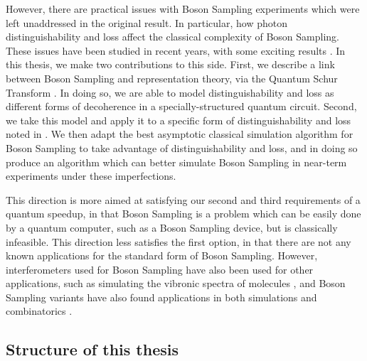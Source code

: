 However, there are practical issues with Boson Sampling experiments which were left unaddressed in the original result. In particular, how photon distinguishability and loss affect the classical complexity of Boson Sampling. These issues have been studied in recent years, with some exciting results \cite{garciapatron2017, renema2018, renema2018loss, oszmaniec2018, brod2019}. In this thesis, we make two contributions to this side. First, we describe a link between Boson Sampling and representation theory, via the Quantum Schur Transform \cite{bacon2004, harrow2005, bacon2007}. In doing so, we are able to model distinguishability and loss as different forms of decoherence in a specially-structured quantum circuit. Second, we take this model and apply it to a specific form of distinguishability and loss noted in \cite{renema2018, renema2018loss}. We then adapt the best asymptotic classical simulation algorithm for Boson Sampling \cite{clifford2017} to take advantage of distinguishability and loss, and in doing so produce an algorithm which can better simulate Boson Sampling in near-term experiments under these imperfections.

This direction is more aimed at satisfying our second and third requirements of a quantum speedup, in that Boson Sampling is a problem which can be easily done by a quantum computer, such as a Boson Sampling device, but is classically infeasible. This direction less satisfies the first option, in that there are not any known applications for the standard form of Boson Sampling. However, interferometers used for Boson Sampling have also been used for other applications, such as simulating the vibronic spectra of molecules \cite{sparrow2018}, and Boson Sampling variants have also found applications in both simulations and combinatorics \cite{huh2015, bradler2018, schuld2019}.

\subsection{Structure of this thesis}


